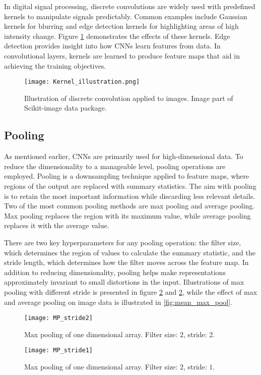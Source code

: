 \documentclass[../../thesis.tex]{subfiles}
\begin{document}
In digital signal processing, discrete convolutions are widely used with predefined kernels to manipulate signals predictably. Common examples include Gaussian kernels for blurring and edge detection kernels for highlighting areas of high intensity change. Figure \ref{fig:kernelIllustration} demonstrates the effects of these kernels. Edge detection provides insight into how CNNs learn features from data. In convolutional layers, kernels are learned to produce feature maps that aid in achieving the training objectives.\newline
\begin{figure}[h]
    \centering
    \texttt{[image: Kernel\_illustration.png]}
    \caption{Illustration of discrete convolution applied to images. Image part of Scikit-image data package.}
    \label{fig:kernelIllustration}
\end{figure}

\subsection{Pooling}
As mentioned earlier, CNNs are primarily used for high-dimensional data. To reduce the dimensionality to a manageable level, pooling operations are employed. Pooling is a downsampling technique applied to feature maps, where regions of the output are replaced with summary statistics. The aim with pooling is to retain the most important information while discarding less relevant details. Two of the most common pooling methods are max pooling and average pooling. Max pooling replaces the region with its maximum value, while average pooling replaces it with the average value.\newline

There are two key hyperparameters for any pooling operation: the filter size, which determines the region of values to calculate the summary statistic, and the stride length, which determines how the filter moves across the feature map. In addition to reducing dimensionality, pooling helps make representations approximately invariant to small distortions in the input. Illustrations of max pooling with different stride is presented in figure \ref{fig:mp2} and \ref{fig:mp2}, while the effect of max and average pooling on image data is illustrated in \ref{fig:mean_max_pool}.\newline

\begin{figure}[h]
    \texttt{[image: MP\_stride2]}
    \centering    
    \caption{Max pooling of one dimensional array. Filter size: $2$, stride: $2$.}
    \label{fig:mp2}
\end{figure}
\begin{figure}[h]
    \texttt{[image: MP\_stride1]}
    \centering    
    \caption{Max pooling of one dimensional array. Filter size: $2$, stride: $1$.}
    \label{fig:mp1}
\end{figure}
\end{document}
